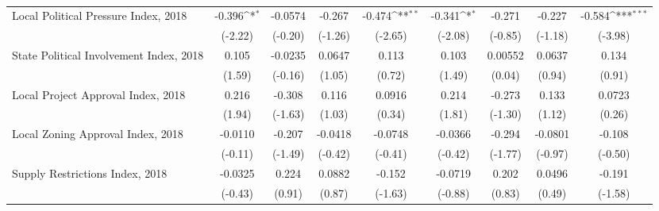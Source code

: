 \begin{table}[htbp]\centering
\def\sym#1{\ifmmode^{#1}\else\(^{#1}\)\fi}
\caption{ \label{tab1}}
\begin{tabular}{l*{8}{c}}
\toprule
\midrule
Local Political Pressure Index, 2018&      -0.396\sym{*}  &     -0.0574         &      -0.267         &      -0.474\sym{**} &      -0.341\sym{*}  &      -0.271         &      -0.227         &      -0.584\sym{***}\\
                    &     (-2.22)         &     (-0.20)         &     (-1.26)         &     (-2.65)         &     (-2.08)         &     (-0.85)         &     (-1.18)         &     (-3.98)         \\
\addlinespace
State Political Involvement Index, 2018&       0.105         &     -0.0235         &      0.0647         &       0.113         &       0.103         &     0.00552         &      0.0637         &       0.134         \\
                    &      (1.59)         &     (-0.16)         &      (1.05)         &      (0.72)         &      (1.49)         &      (0.04)         &      (0.94)         &      (0.91)         \\
\addlinespace
Local Project Approval Index, 2018&       0.216         &      -0.308         &       0.116         &      0.0916         &       0.214         &      -0.273         &       0.133         &      0.0723         \\
                    &      (1.94)         &     (-1.63)         &      (1.03)         &      (0.34)         &      (1.81)         &     (-1.30)         &      (1.12)         &      (0.26)         \\
\addlinespace
Local Zoning Approval Index, 2018&     -0.0110         &      -0.207         &     -0.0418         &     -0.0748         &     -0.0366         &      -0.294         &     -0.0801         &      -0.108         \\
                    &     (-0.11)         &     (-1.49)         &     (-0.42)         &     (-0.41)         &     (-0.42)         &     (-1.77)         &     (-0.97)         &     (-0.50)         \\
\addlinespace
Supply Restrictions Index, 2018&     -0.0325         &       0.224         &      0.0882         &      -0.152         &     -0.0719         &       0.202         &      0.0496         &      -0.191         \\
                    &     (-0.43)         &      (0.91)         &      (0.87)         &     (-1.63)         &     (-0.88)         &      (0.83)         &      (0.49)         &     (-1.58)         \\

\end{tabular}
\end{table}
